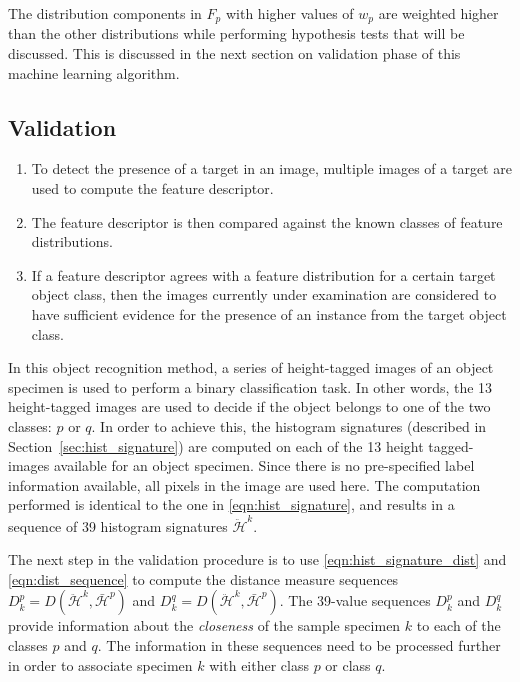 \documentclass {udthesis}
\begin{document}
The distribution components in $F_p$ with higher values of $w_p$ are weighted higher than the other distributions while performing hypothesis tests that will be discussed. This is discussed in the next section on validation phase of this machine learning algorithm.

\subsection{Validation}
\label{sec:distdes_validation}

\begin{enumerate}
	\item To detect the presence of a target in an image, multiple images of a target are used to compute the feature descriptor.
	
	\item The feature descriptor is then compared against the known classes of feature distributions.
	
	\item If a feature descriptor agrees with a feature distribution for a certain target object class, then the images currently under examination are considered to have sufficient evidence for the presence of an instance from the target object class.
\end{enumerate}

In this object recognition method, a series of height-tagged images of an object specimen is used to perform a binary classification task. In other words, the 13 height-tagged images are used to decide if the object belongs to one of the two classes: $p$ or $q$. In order to achieve this, the histogram signatures (described in Section~\ref{sec:hist_signature}) are computed on each of the 13 height tagged-images available for an object specimen. Since there is no pre-specified label information available, all pixels in the image are used here. The computation performed is identical to the one in \eqref{eqn:hist_signature}, and results in a sequence of 39 histogram signatures $\ddot{\mathcal{H}}^{k}$. 

The next step in the validation procedure is to use \eqref{eqn:hist_signature_dist} and \eqref{eqn:dist_sequence} to compute the distance measure sequences $D^p_k=D(\ddot{\mathcal{H}}^{k}, \bar{\mathcal{H}}^{p})$ and $D^q_k=D(\ddot{\mathcal{H}}^{k}, \bar{\mathcal{H}}^{p})$. The 39-value sequences $D^p_k$ and $D^q_k$ provide information about the \emph{closeness} of the sample specimen $k$ to each of the classes $p$ and $q$. The information in these sequences need to be processed further in order to associate specimen $k$ with either class $p$ or class $q$.
\end{document}
